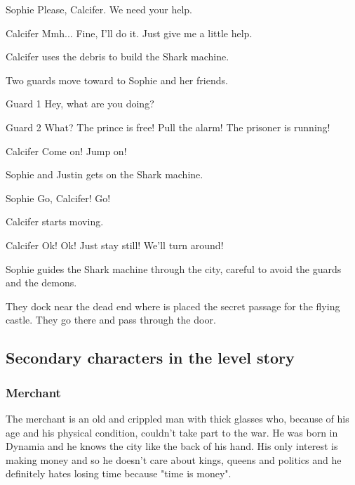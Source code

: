 \begin{screenplay}
\begin{dialogue}{Sophie}
Please, Calcifer. We need your help.
\end{dialogue}

\begin{dialogue}{Calcifer}
Mmh... Fine, I'll do it. Just give me a little help.
\end{dialogue}

Calcifer uses the debris to build the Shark machine.

Two guards move toward to Sophie and her friends.

\begin{dialogue}{Guard 1}
Hey, what are you doing?
\end{dialogue}

\begin{dialogue}[screaming]{Guard 2}
What? The prince is free! Pull the alarm! The prisoner is running!
\end{dialogue}

\begin{dialogue}[worried]{Calcifer}
Come on! Jump on!
\end{dialogue}

Sophie and Justin gets on the Shark machine.

\begin{dialogue}[in a hurry]{Sophie}
Go, Calcifer! Go!
\end{dialogue}

Calcifer starts moving.

\begin{dialogue}[worried]{Calcifer}
Ok! Ok! Just stay still! We'll turn around!
\end{dialogue}

\end{screenplay}
\vspace{1em}

Sophie guides the Shark machine through the city, careful to avoid the guards and the demons.

They dock near the dead end where is placed the secret passage for the flying castle. They go there and pass through the door.

\subsection{Secondary characters in the level story}
\subsubsection*{Merchant}
The merchant is an old and crippled man with thick glasses who, because of his age and his physical condition, couldn't take part to the war. He was born in Dynamia and he knows the city like the back of his hand. His only interest is making money and so he doesn't care about kings, queens and politics and he definitely hates losing time because "time is money".

